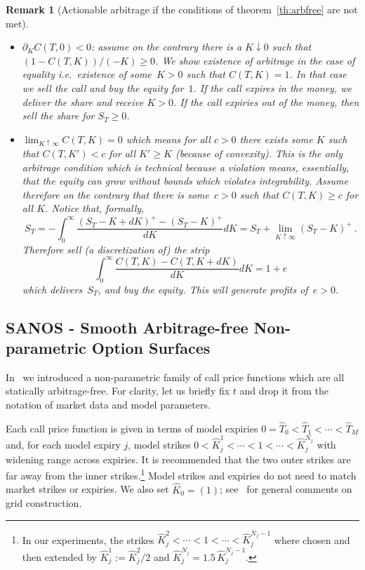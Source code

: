 \documentclass[11pt,a4paper]{article}
\newtheorem{remark}[definition]{Remark}
\begin{document}
\begin{remark}[Actionable arbitrage if the conditions of theorem~\ref{th:arbfree} are not met]
\begin{itemize}
    \item $\partial_K C(T,0)<0$: assume on the contrary there is a $K\downarrow 0$
    such that $(1-C(T,K))/(-K) \geq 0$. We show existence of
    arbitrage in the case of equality
    i.e.~existence of some~$K>0$ such that $C(T,K)=1$.
    In that case we sell the call and buy the equity for~$1$.
    If the call expires in the money, we deliver the share
    and receive $K>0$. If the call expiries out of the money, then sell
    the share for $S_T\geq 0$.

    \item $\lim_{K\uparrow \infty} C(T,K) = 0$ which means for all $c>0$
    there exists some $K$ such that $C(T,K')<c$ for all $K'\geq K$ (because of convexity).
    This is the only arbitrage condition which is technical because a violation means, 
    essentially, that the equity can grow without bounds which violates
    integrability.
    Assume therefore on the contrary 
    that there is some~$c>0$ such that $C(T,K)\geq c$ for all $K$. 
    Notice that, formally,
    $$
        S_T = - \int_0^\infty \frac{ (S_T-K+dK)^+ - (S_T-K)^+ }{ dK } dK
            = S_T + \lim_{K\uparrow \infty} (S_T-K)^+ \ .
    $$
    Therefore sell (a discretization of) the strip
    $$
    \int_0^\infty \frac{ C(T,K) -  C(T,K+dK) }{ dK } dK = 1 + e
    $$
    which delivers~$S_T$, and buy the equity. This will generate profits of~$e>0$.
 \end{itemize}
\end{remark}

\subsection{SANOS - Smooth Arbitrage-free Non-parametric Option Surfaces}
\label{sec:sanos}

In~\cite{SANOS2026} we introduced a  non-parametric family
of call price functions which are all statically arbitrage-free. For clarity, let us briefly fix $t$ and drop it from the notation of market data
and model parameters.

Each call price function is given in terms of model expiries $0 = \hat T_0 < \hat T_1 < \cdots < \hat T_M$ and, for each model
expiry $j$, model strikes $0 < \hat K_j^1 < \cdots < 1 < \cdots < \hat K_j^{N_j }$
with widening range across expiries.
 It is recommended that the two outer strikes
are far away from the inner strikes.\footnote{
    In our experiments, the strikes $\hat K^2_j<\cdots<1<\cdots<\hat K^{N_j-1}_j$
    where chosen and then extended by $\hat K^1_j:=\hat K^2_j/2$ and
    $\hat K^{N_j}_j = 1.5\,\hat K^{N_j-1}_j$.
}  Model strikes and expiries do not need to match
market strikes or expiries.
We also set $\hat K_0=(1)$; see~\cite{SANOS2026} for general comments on grid construction.
\end{document}
